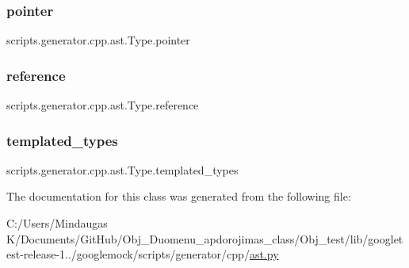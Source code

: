 \subsubsection{\texorpdfstring{pointer}{pointer}}
{\footnotesize\ttfamily scripts.\+generator.\+cpp.\+ast.\+Type.\+pointer}

\mbox{\label{classscripts_1_1generator_1_1cpp_1_1ast_1_1_type_a6785886dc7046eeaa1189c4df7d79e19}} 
\subsubsection{\texorpdfstring{reference}{reference}}
{\footnotesize\ttfamily scripts.\+generator.\+cpp.\+ast.\+Type.\+reference}

\mbox{\label{classscripts_1_1generator_1_1cpp_1_1ast_1_1_type_a0c0032e5e17a59621b127c1c6ad27344}} 
\subsubsection{\texorpdfstring{templated\_types}{templated\_types}}
{\footnotesize\ttfamily scripts.\+generator.\+cpp.\+ast.\+Type.\+templated\+\_\+types}



The documentation for this class was generated from the following file\+:\begin{DoxyCompactItemize}
\item 
C\+:/\+Users/\+Mindaugas K/\+Documents/\+Git\+Hub/\+Obj\+\_\+\+Duomenu\+\_\+apdorojimas\+\_\+class/\+Obj\+\_\+test/lib/googletest-\/release-\/1../googlemock/scripts/generator/cpp/\mbox{\hyperlink{_obj__test_2lib_2googletest-release-1_88_81_2googlemock_2scripts_2generator_2cpp_2ast_8py}{ast.\+py}}\end{DoxyCompactItemize}
